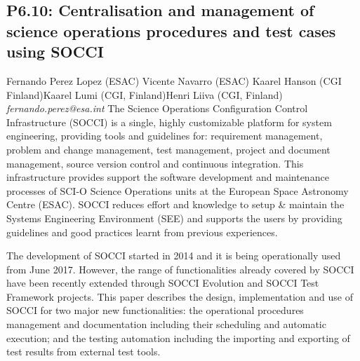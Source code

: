 \documentclass{report}
\begin{document}
\subsection*{P6.10: Centralisation and management of science operations procedures and test cases using SOCCI}
\bigskip
Fernando Perez Lopez (ESAC) \newline Vicente Navarro (ESAC) \newline  Kaarel Hanson (CGI Finland)\newline  Kaarel Lumi (CGI, Finland)\newline Henri Liiva (CGI, Finland)\newline  \newline\newline
{\it fernando.perez@esa.int}\newline
\newline\newline
The Science Operations Configuration Control Infrastructure (SOCCI) is a single, highly customizable platform for system engineering, providing tools and guidelines for: requirement management, problem and change management, test management, project and document management, source version control and continuous integration. This infrastructure provides support the software development and maintenance processes of SCI-O Science Operations units at the European Space Astronomy Centre (ESAC). SOCCI reduces effort and knowledge to setup \& maintain the Systems Engineering Environment (SEE) and supports the users by providing guidelines and good practices learnt from previous experiences. 

The development of SOCCI started in 2014 and it is being operationally used from June 2017. However, the range of functionalities already covered by SOCCI have been recently extended through SOCCI Evolution and SOCCI Test Framework projects. This paper describes the design, implementation and use of SOCCI for two major new functionalities: the operational procedures management and documentation including their scheduling and automatic execution; and the testing automation including the importing and exporting of test results from external test tools.\newline
\newpage
\end{document}
